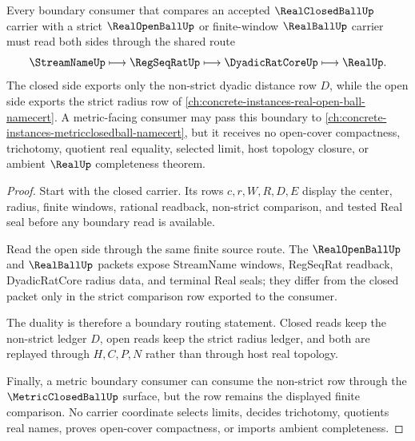 \begin{theorem}
\label{thm:real-closed-ball-open-boundary-duality}
Every boundary consumer that compares an accepted $\RealClosedBallUp$ carrier with a strict $\RealOpenBallUp$ or finite-window $\RealBallUp$ carrier must read both sides through the shared route
$$
\StreamNameUp \longmapsto \RegSeqRatUp \longmapsto \DyadicRatCoreUp \longmapsto \RealUp .
$$
The closed side exports only the non-strict dyadic distance row $D$, while the open side exports the strict radius row of \autoref{ch:concrete-instances-real-open-ball-namecert}. A metric-facing consumer may pass this boundary to \autoref{ch:concrete-instances-metricclosedball-namecert}, but it receives no open-cover compactness, trichotomy, quotient real equality, selected limit, host topology closure, or ambient $\RealUp$ completeness theorem.
\end{theorem}
\begin{proof}
Start with the closed carrier. Its rows $c,r,W,R,D,E$ display the center, radius, finite windows, rational readback, non-strict comparison, and tested Real seal before any boundary read is available.

Read the open side through the same finite source route. The $\RealOpenBallUp$ and $\RealBallUp$ packets expose StreamName windows, RegSeqRat readback, DyadicRatCore radius data, and terminal Real seals; they differ from the closed packet only in the strict comparison row exported to the consumer.

The duality is therefore a boundary routing statement. Closed reads keep the non-strict ledger $D$, open reads keep the strict radius ledger, and both are replayed through $H,C,P,N$ rather than through host real topology.

Finally, a metric boundary consumer can consume the non-strict row through the $\MetricClosedBallUp$ surface, but the row remains the displayed finite comparison. No carrier coordinate selects limits, decides trichotomy, quotients real names, proves open-cover compactness, or imports ambient completeness.
\end{proof}


